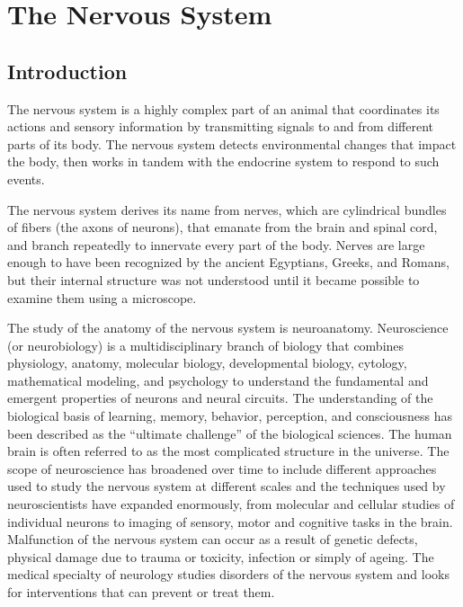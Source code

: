 \documentclass[]{book}
\begin{document}
\hypertarget{the-nervous-system}{%
\chapter{The Nervous System}\label{the-nervous-system}}

\hypertarget{introduction}{%
\section{Introduction}\label{introduction}}

The nervous system is a highly complex part of an animal that coordinates its actions and sensory information by transmitting signals to and from different parts of its body. The nervous system detects environmental changes that impact the body, then works in tandem with the endocrine system to respond to such events.

The nervous system derives its name from nerves, which are cylindrical bundles of fibers (the axons of neurons), that emanate from the brain and spinal cord, and branch repeatedly to innervate every part of the body. Nerves are large enough to have been recognized by the ancient Egyptians, Greeks, and Romans, but their internal structure was not understood until it became possible to examine them using a microscope.

The study of the anatomy of the nervous system is neuroanatomy. Neuroscience (or neurobiology) is a multidisciplinary branch of biology that combines physiology, anatomy, molecular biology, developmental biology, cytology, mathematical modeling, and psychology to understand the fundamental and emergent properties of neurons and neural circuits. The understanding of the biological basis of learning, memory, behavior, perception, and consciousness has been described as the ``ultimate challenge'' of the biological sciences. The human brain is often referred to as the most complicated structure in the universe. The scope of neuroscience has broadened over time to include different approaches used to study the nervous system at different scales and the techniques used by neuroscientists have expanded enormously, from molecular and cellular studies of individual neurons to imaging of sensory, motor and cognitive tasks in the brain. Malfunction of the nervous system can occur as a result of genetic defects, physical damage due to trauma or toxicity, infection or simply of ageing. The medical specialty of neurology studies disorders of the nervous system and looks for interventions that can prevent or treat them.
\end{document}

